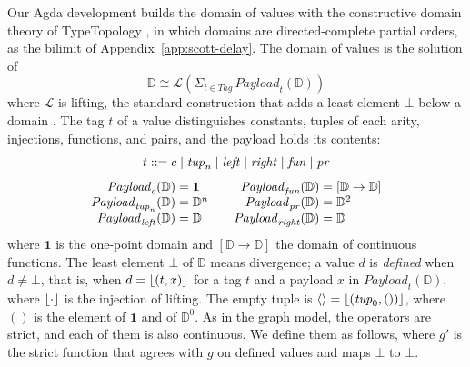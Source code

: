 Our Agda development builds the domain of values with the constructive
domain theory of TypeTopology \citep{deJong:2023aa}, in which domains
are directed-complete partial orders, as the bilimit of
Appendix~\ref{app:scott-delay}. The domain of values is the solution of
\[
  \mathbb{D} \cong \mathcal{L}(\Sigma_{t \in \mathit{Tag}}\, \mathit{Payload}_t(\mathbb{D}))
\]
where $\mathcal{L}$ is lifting, the standard construction that adds a
least element $\bot$ below a domain \citep{Winskel:1993aa,Escardo:2017ab}. The tag $t$ of a value distinguishes constants, tuples of each arity,
injections, functions, and pairs, and the payload holds its contents:
\[
\begin{array}{@{}r@{\;}c@{\;}l@{}}
  t & ::= & c \mid \mathit{tup}_n \mid \mathit{left} \mid \mathit{right}
    \mid \mathit{fun} \mid \mathit{pr}
\end{array}
\]
\[
\begin{array}{@{}r@{\;}c@{\;}l@{\qquad}r@{\;}c@{\;}l@{}}
  \mathit{Payload}_c(\mathbb{D}) & = & \mathbf{1} &
  \mathit{Payload}_{\mathit{fun}}(\mathbb{D}) & = & [\mathbb{D} \to \mathbb{D}]\\
  \mathit{Payload}_{\mathit{tup}_n}(\mathbb{D}) & = & \mathbb{D}^n &
  \mathit{Payload}_{\mathit{pr}}(\mathbb{D}) & = & \mathbb{D}^2\\
  \mathit{Payload}_{\mathit{left}}(\mathbb{D}) & = & \mathbb{D} &
  \mathit{Payload}_{\mathit{right}}(\mathbb{D}) & = & \mathbb{D}
\end{array}
\]
where $\mathbf{1}$ is the one-point domain and $[\mathbb{D} \to \mathbb{D}]$
the domain of continuous functions. The least element $\bot$ of $\mathbb{D}$ means divergence;
a value $d$ is \emph{defined} when $d \neq \bot$, that is, when
$d = \lfloor (t, x) \rfloor$ for a tag $t$ and a payload $x$ in
$\mathit{Payload}_t(\mathbb{D})$, where $\lfloor \cdot \rfloor$ is the injection of
lifting. The empty tuple is $\langle\rangle = \lfloor (\mathit{tup}_0, ()) \rfloor$,
where $()$ is the element of $\mathbf{1}$ and of $\mathbb{D}^0$. As in the graph model, the operators are
strict, and each of them is also continuous. We define them as follows,
where $g'$ is the strict function that agrees with $g$ on defined
values and maps $\bot$ to $\bot$.
